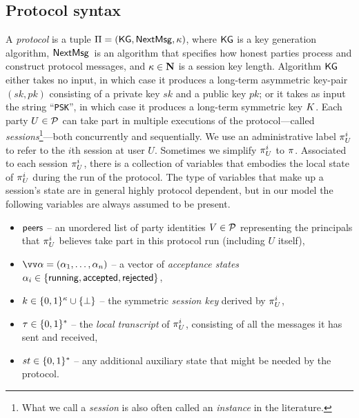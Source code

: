 \subsection{Protocol syntax}\label{sec:definitions:unfied:syntax}
A \emph{protocol} is a tuple $\mathrm{\Pi} = (\mathsf{KG}, \mathsf{NextMsg}, \kappa)$,
where $\mathsf{KG}$ is a key generation algorithm,
$\mathsf{NextMsg}$~is an algorithm that specifies how honest parties process and construct protocol messages,
and $\kappa \in \mathbf{N}$ is a session key length.
Algorithm $\mathsf{KG}$ either takes no input,
in which case it produces a long-term asymmetric key-pair $(sk,pk)$ consisting of a private key $sk$ and a public key $pk$;
or it takes as input the string ``\texttt{PSK}'',
in which case it produces a long-term symmetric key $K$.
Each party $U \in \mathcal{P}$  can take part in multiple executions of the protocol---called \emph{sessions}\footnote{What
we call a \emph{session} is also often called an \emph{instance} in the literature.
}---both concurrently and sequentially. 
We use an administrative label $\oracle[U][i]$ to refer to the $i$th session at user $U$. 
Sometimes we simplify $\oracle[U][i]$ to  $\oracle$. 
Associated to each session $\oracle[U][i]$,
there is a collection of variables that embodies the local state of $\oracle[U][i]$ during the run of the protocol.
The type of variables that make up a session's state are in general highly protocol dependent,
but in our model the following variables are always assumed to be present.
\begin{itemize}

		
	\item $\mathsf{peers}$ -- an unordered list of party identities $V \in \mathcal{P}$ representing the principals that $\oracle[U][i]$ believes take part in this protocol run (including $U$ itself),
	

	
	\item $\vrunstate = (\runstate_1,\dotsc,\runstate_n)$ -- a vector of \emph{acceptance states} $\alpha_i \in \lbrace \mathsf{running}, \allowbreak \mathsf{accepted}, \allowbreak \mathsf{rejected} \rbrace$,


	\item $k \in \lbrace 0, 1 \rbrace^\kappa \cup \lbrace \bot \rbrace$ -- the symmetric \emph{session key} derived by $\oracle[U][i]$,
	
	\item $\tau \in \lbrace 0, 1 \rbrace^*$ -- the \emph{local transcript} of $\oracle[U][i]$, consisting of all the messages it has sent and received,
	
	\item $st \in \lbrace 0, 1 \rbrace^{*}$ -- any additional auxiliary state that might be needed by the protocol.
	
	
\end{itemize}

